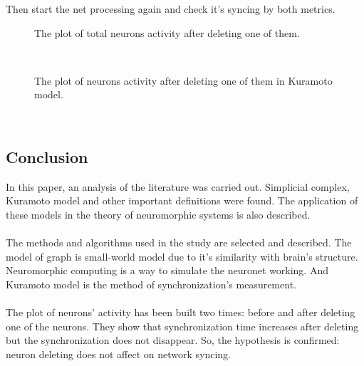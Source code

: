 \documentclass[draft]{article}
\newcommand\tab[1][1cm]{\hspace*{#1}}
\begin{document}
\tab Then start the net processing again and check it's syncing by both metrics.
\begin{figure}[h]
\caption{The plot of total neurons activity after deleting one of them.}
\label{ris:image}
\end{figure}\\
\begin{figure}[h]
\caption{The plot of neurons activity after deleting one of them in Kuramoto model.}
\label{ris:image}
\end{figure}\\
\newpage
\begin{center}
\section {Conclusion}
\end{center}
\tab In this paper, an analysis of the literature was carried out. Simplicial complex, Kuramoto model and other important definitions were found. The application of these models in the theory of neuromorphic systems is also described.\\
~\\
\tab The methods and algorithms used in the study are selected and described. The model of graph is small-world model due to it's similarity with brain's structure. Neuromorphic computing is a way to simulate the neuronet working. And Kuramoto model is the method of synchronization's measurement.\\
~\\
\tab The plot of neurons' activity has been built two times: before and after deleting one of the neurons. They show that synchronization time increases after deleting but the synchronization does not disappear. So, the hypothesis is confirmed: neuron deleting does not affect on network syncing.\\
\end{document}
